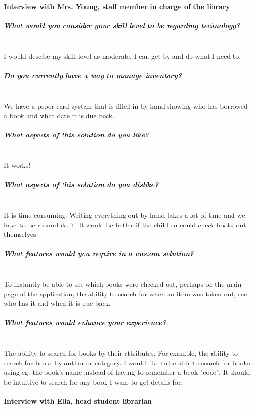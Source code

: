\documentclass[../../../main.tex]{subfiles}
\begin{document}
\paragraph{Interview with Mrs. Young, staff member in charge of the library}

\subparagraph{What would you consider your skill level to be regarding technology?}

\noindent \\ I would descibe my skill level as moderate, I can get by and do what I need to.

\subparagraph{Do you currently have a way to manage inventory?}

\noindent \\ We have a paper card system that is filled in by hand showing who has borrowed a book and what date it is due back.

\subparagraph{What aspects of this solution do you like?}

\noindent \\ It works!

\subparagraph{What aspects of this solution do you dislike?}

\noindent \\ It is time consuming. Writing everything out by hand takes a lot of time and we have to be around do it.
It would be better if the children could check books out themselves.

\subparagraph{What features would you require in a custom solution?}

\noindent \\ To instantly be able to see which books were checked out, perhaps on the main page of the application, the ability to search for when an item was taken out, see who has it and when it is due back.

\subparagraph{What features would enhance your experience?}

\noindent \\ The ability to search for books by their attributes. For example, the ability to search for books by author or category.
I would like to be able to search for books using eg. the book's name instead of having to remember a book "code". It should be intuitive to search for any book I want to get details for.

\paragraph{Interview with Ella, head student librarian}
\end{document}
